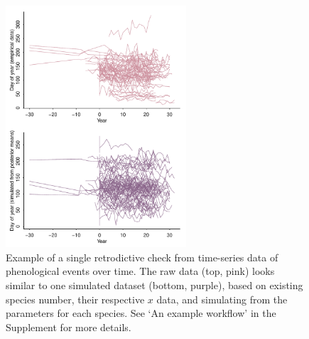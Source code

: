 \documentclass[11pt]{article}
\providecommand{\DIFaddbeginFL}{} %
\providecommand{\DIFaddendFL}{} %
\providecommand{\DIFdelbeginFL}{} %
\providecommand{\DIFdelendFL}{} %
\newcommand{\DIFscaledelfig}{0.5}
\newlength{\DIFdelgraphicswidth} %
\newlength{\DIFdelgraphicsheight} %
\newcommand{\DIFaddincludegraphics}[2][]{{\color{blue}\fbox{\DIFOincludegraphics[#1]{#2}}}} %
\newcommand{\DIFdelincludegraphics}[2][]{%
\sbox{\DIFdelgraphicsbox}{\DIFOincludegraphics[#1]{#2}}%
\settoboxwidth{\DIFdelgraphicswidth}{\DIFdelgraphicsbox} %
\settoboxtotalheight{\DIFdelgraphicsheight}{\DIFdelgraphicsbox} %
\scalebox{\DIFscaledelfig}{%
\parbox[b]{\DIFdelgraphicswidth}{\usebox{\DIFdelgraphicsbox}\\[-\baselineskip] \rule{\DIFdelgraphicswidth}{0em}}\llap{\resizebox{\DIFdelgraphicswidth}{\DIFdelgraphicsheight}{%
\setlength{\unitlength}{\DIFdelgraphicswidth}%
\begin{picture}(1,1)%
\thicklines\linethickness{2pt} %
{\color[rgb]{1,0,0}\put(0,0){\framebox(1,1){}}}%
{\color[rgb]{1,0,0}\put(0,0){\line( 1,1){1}}}%
{\color[rgb]{1,0,0}\put(0,1){\line(1,-1){1}}}%
\end{picture}%
}\hspace*{3pt}}} %
} %
\DeclareRobustCommand{\DIFaddbeginFL}{\DIFOaddbeginFL \let\includegraphics\DIFaddincludegraphics} %
\DeclareRobustCommand{\DIFaddendFL}{\DIFOaddendFL \let\includegraphics\DIFOincludegraphics} %
\DeclareRobustCommand{\DIFdelbeginFL}{\DIFOdelbeginFL \let\includegraphics\DIFdelincludegraphics} %
\DeclareRobustCommand{\DIFdelendFL}{\DIFOaddendFL \let\includegraphics\DIFOincludegraphics} %
\begin{document}
\begin{figure}[ht]
\centering
\noindent \DIFdelbeginFL %
\DIFdelendFL \DIFaddbeginFL \includegraphics[width=0.6\textwidth]{examples/synchrony/graphs/rawvsonepredictivecheck.pdf}
\DIFaddendFL \caption{Example of a single retrodictive check from time-series data of phenological events over time. The raw data (top, pink) looks similar to one simulated dataset (bottom, purple), based on existing species number, their respective $x$ data, and simulating from the parameters for each species. See `An example workflow' in the Supplement for more details.}
\label{fig:retrodictivecheck}
\end{figure}
\end{document}
